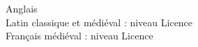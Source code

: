
\begin{small} \color{black}
Anglais \\
Latin classique et médiéval : niveau Licence \\
Français médiéval : niveau Licence \\
\end{small}

